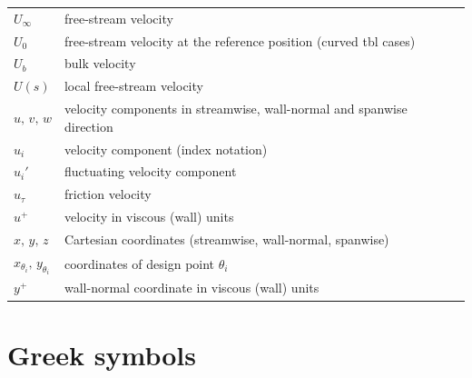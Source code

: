\begin{longtable}[t]{@{}p{}p{}@{}}
    $U_{\infty}$ & free-stream velocity \\
    $U_0$ & free-stream velocity at the reference position (curved \acrshort{tbl} cases) \\
    $U_b$ & bulk velocity \\
    $U(s)$ & local free-stream velocity \\
    $u,\,v,\,w$ & velocity components in streamwise, wall-normal and spanwise direction \\
    $u_i$ & velocity component (index notation) \\
    $u_i'$ & fluctuating velocity component \\
    $u_\tau$ & friction velocity \\
    $u^+$ & velocity in viscous (wall) units \\
    $x,\,y,\,z$ & Cartesian coordinates (streamwise, wall-normal, spanwise) \\
    $x_{\theta_i},\,y_{\theta_i}$ & coordinates of design point $\theta_i$ \\
    $y^+$ & wall-normal coordinate in viscous (wall) units \\
\end{longtable}

\ifenglish
\section*{Greek symbols}
\else
